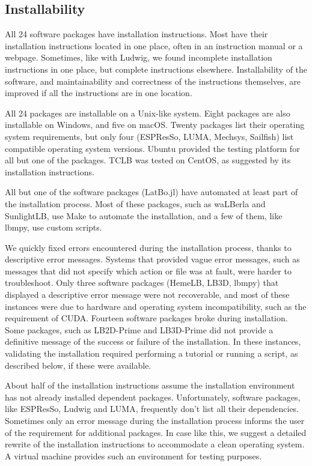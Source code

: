 \documentclass[final, 3p, times, authoryear]{elsarticle}
\newcommand{\esp}{ESPResSo\nolinebreak\hspace{-.05em}\raisebox{.4ex}{\small\bf
+}\nolinebreak\hspace{-.10em}\raisebox{.4ex}{\small\bf +}}
\begin{document}
\subsection{Installability}

All 24 software packages have installation instructions. Most have their
installation instructions located in one place, often in an instruction manual
or a webpage. Sometimes, like with Ludwig, we found incomplete installation
instructions in one place, but complete instructions elsewhere. Installability
of the software, and maintainability and correctness of the instructions
themselves, are improved if all the instructions are in one location.

All 24 packages are installable on a Unix-like system. Eight packages are also
installable on Windows, and five on macOS. Twenty packages list their operating
system requirements, but only four (ESPResSo, LUMA, Mechsys, Sailfish) list
compatible operating system versions. Ubuntu provided the testing platform for
all but one of the packages. TCLB was tested on CentOS, as suggested by its
installation instructions. 

All but one of the software packages (LatBo.jl) have automated at least part of
the installation process. Most of these packages, such as waLBerla and
SunlightLB, use Make to automate the installation, and a few of them, like
lbmpy, use custom scripts.

We quickly fixed errors encountered during the installation process, thanks to
descriptive error messages. Systems that provided vague error messages, such as
messages that did not specify which action or file was at fault, were harder to
troubleshoot. Only three software packages (HemeLB, LB3D, lbmpy) that displayed
a descriptive error message were not recoverable, and most of these instances
were due to hardware and operating system incompatibility, such as the
requirement of CUDA. Fourteen software packages broke during installation. Some
packages, such as LB2D-Prime and LB3D-Prime did not provide a definitive message
of the success or failure of the installation. In these instances, validating
the installation required performing a tutorial or running a script, as
described below, if these were available. 

About half of the installation instructions assume the installation environment
has not already installed dependent packages. Unfortunately, software packages,
like \esp, Ludwig and LUMA, frequently don't list all their dependencies.
Sometimes only an error message during the installation process informs the user
of the requirement for additional packages. In case like this, we suggest a
detailed rewrite of the installation instructions to accommodate a clean
operating system. A virtual machine provides such an environment for testing
purposes. 
\end{document}
